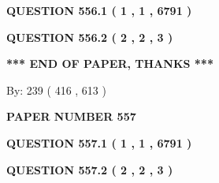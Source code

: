 \documentclass[12pt]{article}
\begin{document}
   
   
   
 \vspace{0.2in}
 
 
 
 
   
   
  
\vspace{0.2in}
  
{\textbf{\Large{QUESTION
556.1 
 ( 1 , 1 , 6791 )
}}}
  
  
  
\vspace{0.2in}
  
{\textbf{\Large{QUESTION
556.2 
 ( 2 , 2 , 3 )
}}}
  
  
   
   
 \vspace{0.2in}
 
   
   
   
   
\vspace{1.0in} 
{\textbf{\large{ *** END OF PAPER, THANKS *** }}} 
   
   
\hspace{1.0in} By: 
 239 ( 416 ,  613 )
   
   
   
   
\newpage 
\setcounter{page}{ 
   557001 } 
   
   
   
   
 {\textbf{ \Large{ PAPER NUMBER  557  }}}
   
   
\vspace{0.2in}
   
   
   
   
   
   
 \vspace{0.2in}
 
 
 
 
   
   
  
\vspace{0.2in}
  
{\textbf{\Large{QUESTION
557.1 
 ( 1 , 1 , 6791 )
}}}
  
  
  
\vspace{0.2in}
  
{\textbf{\Large{QUESTION
557.2 
 ( 2 , 2 , 3 )
}}}
  
  
   
   
 \vspace{0.2in}
 
\end{document}
